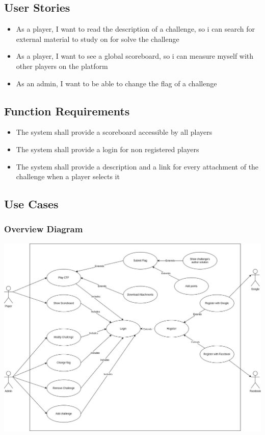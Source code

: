 \documentclass[12pt]{article}
\begin{document}
\subsection{User Stories}
\begin{itemize}
\item As a player, I want to read the description of a challenge, so i can search for external material to study on for solve the challenge
\item As a player, I want to see a global scoreboard, so i can measure myself with other players on the platform
\item As an admin, I want to be able to change the flag of a challenge
\end{itemize}
\subsection{Function Requirements}
\begin{itemize}
\item The system shall provide a scoreboard accessible by all players
\item The system shall provide a login for non registered players
\item The system shall provide a description and a link for every attachment of the challenge when a player selects it
\end{itemize}
\subsection{Use Cases}
\subsubsection{Overview Diagram}
\includegraphics[scale=0.4]{Use Case Diagram.jpg}
\end{document}

